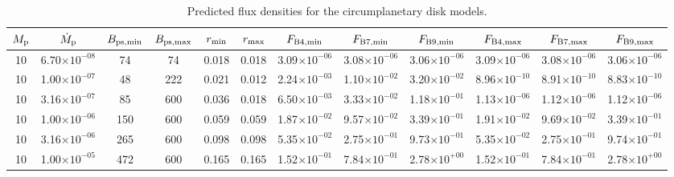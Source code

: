 
\begin{table}
    \caption{Predicted flux densities for the circumplanetary disk models.}
    \label{tab:model_fluxes}
    \centering
\begin{tabular}{cccccccccccc}
\toprule
$M_{\rm p}$ & $\dot{M}_{\rm p}$ & $B_{\rm ps,min}$ & $B_{\rm ps,max}$ & $r_{\rm min}$ & $r_{\rm max}$ & $F_{\rm B4,min}$ & $F_{\rm B7,min}$ & $F_{\rm B9,min}$ & $F_{\rm B4,max}$ & $F_{\rm B7,max}$ & $F_{\rm B9,max}$ \\
\midrule
10 & 6.70$\times 10^{-08}$ & 74 & 74 & 0.018 & 0.018 & 3.09$\times 10^{-06}$ & 3.08$\times 10^{-06}$ & 3.06$\times 10^{-06}$ & 3.09$\times 10^{-06}$ & 3.08$\times 10^{-06}$ & 3.06$\times 10^{-06}$ \\
10 & 1.00$\times 10^{-07}$ & 48 & 222 & 0.021 & 0.012 & 2.24$\times 10^{-03}$ & 1.10$\times 10^{-02}$ & 3.20$\times 10^{-02}$ & 8.96$\times 10^{-10}$ & 8.91$\times 10^{-10}$ & 8.83$\times 10^{-10}$ \\
10 & 3.16$\times 10^{-07}$ & 85 & 600 & 0.036 & 0.018 & 6.50$\times 10^{-03}$ & 3.33$\times 10^{-02}$ & 1.18$\times 10^{-01}$ & 1.13$\times 10^{-06}$ & 1.12$\times 10^{-06}$ & 1.12$\times 10^{-06}$ \\
10 & 1.00$\times 10^{-06}$ & 150 & 600 & 0.059 & 0.059 & 1.87$\times 10^{-02}$ & 9.57$\times 10^{-02}$ & 3.39$\times 10^{-01}$ & 1.91$\times 10^{-02}$ & 9.69$\times 10^{-02}$ & 3.39$\times 10^{-01}$ \\
10 & 3.16$\times 10^{-06}$ & 265 & 600 & 0.098 & 0.098 & 5.35$\times 10^{-02}$ & 2.75$\times 10^{-01}$ & 9.73$\times 10^{-01}$ & 5.35$\times 10^{-02}$ & 2.75$\times 10^{-01}$ & 9.74$\times 10^{-01}$ \\
10 & 1.00$\times 10^{-05}$ & 472 & 600 & 0.165 & 0.165 & 1.52$\times 10^{-01}$ & 7.84$\times 10^{-01}$ & 2.78$\times 10^{+00}$ & 1.52$\times 10^{-01}$ & 7.84$\times 10^{-01}$ & 2.78$\times 10^{+00}$ \\
\bottomrule
\end{tabular}

\end{table}
